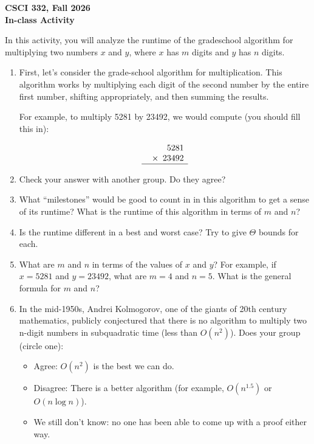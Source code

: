 \documentclass[11pt]{article}
\begin{document}
\begin{center}
\Large\textbf{CSCI 332, Fall 2026}%
\\
\LARGE\textbf{In-class Activity}%
\end{center}

In this activity, you will analyze the runtime of the gradeschool algorithm
for multiplying two numbers $x$ and $y$, where $x$ has $m$ digits and $y$ has 
$n$ digits.

\begin{enumerate}
   \item 
First, let's consider the grade-school algorithm for multiplication.
This algorithm works by multiplying each digit of the second number
by the entire first number, shifting appropriately, and then summing
the results.

For example, to multiply 5281 by 23492, we would compute (you should fill this
in):

\[
\begin{array}{r}
   \phantom{00000}5281 \\
\times\phantom{0}23492 \\
\hline
\end{array}
\]
\vspace{2in}

\item Check your answer with another group. Do they agree?

\item  What ``milestones'' would be good to count in in this algorithm to get a
sense of its runtime? What is the runtime of this algorithm in terms of $m$ and
$n$? 
\vspace{2in}

\item Is the runtime
different in a best and worst case? Try to give $\Theta$ bounds for each.
\newpage

\item What are $m$ and $n$ in terms of the values of $x$ and $y$? For example,
if $x = 5281$ and $y = 23492$, what are $m=4$ and $n=5$. What is the general formula for $m$ and $n$?

\vspace{1in}

\item In the mid-1950s, Andrei Kolmogorov, one of the giants of 20th century
mathematics, publicly conjectured that there is no algorithm to multiply two
n-digit numbers in subquadratic time (less than $O(n^2)$). Does your group (circle one):
\begin{itemize}
   \item Agree: $O(n^2)$ is the best we can do.
   \item Disagree: There is a better algorithm (for example, $O(n^{1.5})$ or $O(n \log n)$).
   \item We still don't know: no one has been able to come up with a proof either way.
\end{itemize}


\end{enumerate}

\end{document}
